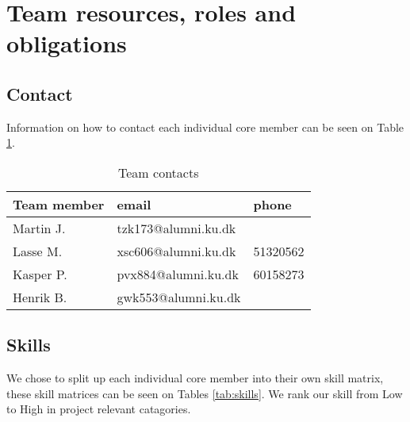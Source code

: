 \section{Team resources, roles and obligations}


\subsection{Contact}
Information on how to contact each individual core member can be seen on Table \ref{tab:contacts}.
\begin{table}[!ht]
    \centering
    \begin{tabular}{l|l|l}
        \rowcolor{Gray}
        \textbf{Team member} & \textbf{email} & \textbf{phone} \\\hline
        Martin J.            & tzk173@alumni.ku.dk & \\
        Lasse M.             & xsc606@alumni.ku.dk & 51320562 \\
        Kasper P.            & pvx884@alumni.ku.dk & 60158273 \\
        Henrik B.            & gwk553@alumni.ku.dk & 
    \end{tabular}
    \caption{Team contacts}
    \label{tab:contacts}
\end{table}

\subsection{Skills}
We chose to split up each individual core member into their own skill matrix,
these skill matrices can be seen on Tables \ref{tab:skills}.
We rank our skill from Low to High in project relevant catagories.

